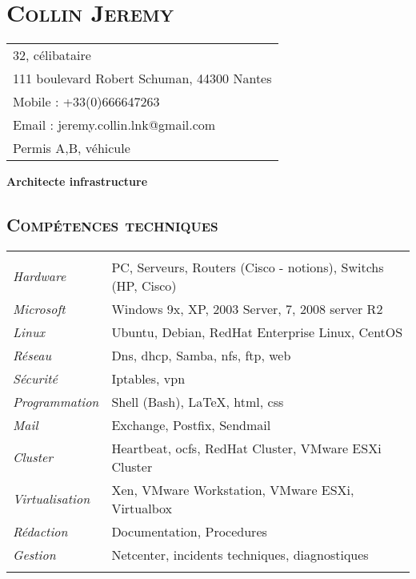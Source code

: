 \documentclass[a4paper,8pt]{article}
\newcommand{\hsection}[1]{\section*{\fontfamily{phv}\selectfont\textsc{#1}}}
\newcommand{\hsubsection}[1]{\subsection*{\fontfamily{phv}\selectfont\textsc{#1}}}
\begin{document}
\selectfont
\hsection{Collin Jeremy}
\begin{tabular}{p{16.5cm}}
\hline
32, célibataire\\
111 boulevard Robert Schuman, 44300 Nantes\\
Mobile : +33(0)666647263\\
Email : jeremy.collin.lnk@gmail.com\\
Permis A,B, véhicule\\
\end{tabular}
\begin{center}
\textbf{{\Large Architecte infrastructure}}
\end{center}
\hsubsection{Compétences techniques}
\begin{tabular}{P{3.5cm}|p{13cm}}
 & \\
\textsl{Hardware}		& PC, Serveurs, Routers (Cisco - notions), Switchs (HP, Cisco)\\
\textsl{Microsoft}	&	Windows 9x, XP, 2003 Server, 7, 2008 server R2\\
\textsl{Linux}			& Ubuntu, Debian, RedHat Enterprise Linux, CentOS\\
\textsl{Réseau}			& Dns, dhcp, Samba, nfs, ftp, web\\
\textsl{Sécurité}		& Iptables, vpn\\
\textsl{Programmation}		& Shell (Bash), \LaTeX, html, css\\
\textsl{Mail}			& Exchange, Postfix, Sendmail\\
\textsl{Cluster}		& Heartbeat, ocfs, RedHat Cluster, VMware ESXi Cluster\\
\textsl{Virtualisation}		& Xen, VMware Workstation, VMware ESXi, Virtualbox\\
\textsl{Rédaction}		& Documentation, Procedures\\
\textsl{Gestion}		& Netcenter, incidents techniques, diagnostiques\\
 & \\
\end{tabular}
\end{document}
